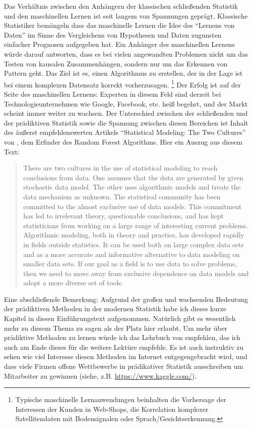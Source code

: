 \documentclass[a4paper,twoside]{tufte-book}\usepackage[]{graphicx}\usepackage[]{color}
\begin{document}
Das Verhältnis zwischen den Anhängern der klassischen schließenden Statistik und den maschinellen Lernen ist seit langem von Spannungen geprägt. Klassische Statistiker bemängeln dass das maschinelle Lernen die Idee des "`Lernens von Daten"' im Sinne des Vergleichens von Hypothesen und Daten zugunsten einfacher Prognosen aufgegeben hat. Ein Anhänger des maschinellen Lernens würde darauf antworten, dass es bei vielen angewandten Problemen nicht um das Testen von kausalen Zusammenhängen, sondern nur um das Erkennen von Pattern geht. Das Ziel ist es, einen Algorithmus zu erstellen, der in der Lage ist bei einem komplexen Datensatz korrekt vorherzusagen. \footnote{Typische maschinelle Lernanwendungen beinhalten die Vorhersage der Interessen der Kunden in Web-Shops, die Korrelation komplexer Satellitendaten mit Bodensignalen oder Sprach/Gesichtserkennung.} Der Erfolg ist auf der Seite des maschinellen Lernens: Experten in diesem Feld sind derzeit bei Technologieunternehmen wie Google, Facebook, etc. heiß begehrt, und der Markt scheint immer weiter zu wachsen. Der Unterschied zwischen der schließenden und der prädiktiven Statistik sowie die Spannung zwischen diesen Bereichen ist Inhalt des äußerst empfehlenswerten Artikels "`Statistical Modeling: The Two Cultures"' von \citet{Breiman-StatisticalModelingTwo-2001}, dem Erfinder des Random Forest Algorithms. Hier ein Auszug aus diesem Text:

\begin{quote}
There are two cultures in the use of statistical modeling to reach conclusions from data. One assumes that the data are generated by given stochastic data model. The other uses algorithmic models and treats the data mechanism as unknown. The statistical community has been committed to the almost exclusive use of data models. This commitment has led to irrelevant theory, questionable conclusions, and has kept statisticians from working on a large range of interesting current problems. Algorithmic modeling, both in theory and practice, has developed rapidly in fields outside statistics. It can be used both on large complex data sets and as a more accurate and informative alternative to data modeling on smaller data sets. If our goal as a field is to use data to solve problems, then we need to move away from exclusive dependence on data models and adopt a more diverse set of tools.
\end{quote}

Eine abschließende Bemerkung: Aufgrund der großen und wachsenden Bedeutung der prädiktiven Methoden in der modernen Statistik habe ich dieses kurze Kapitel in diesen Einführungstext aufgenommen. Natürlich gibt es wesentlich mehr zu diesem Thema zu sagen als der Platz hier erlaubt. Um mehr über prädiktive Methoden zu lernen würde ich das Lehrbuch von \citet{James-IntroductiontoStatistical-2013} empfehlen, das ich auch am Ende dieses für die weitere Lektüre empfehle. Es ist auch instruktiv zu sehen wie viel Interesse diesen Methoden im Internet entgegengebracht wird, und dass viele Firmen offene Wettbewerbe in prädikativer Statistik ausschreiben um Mitarbeiter zu gewinnen (siehe, z.B. \href{kaggle.com}{https://www.kaggle.com/}). 
\end{document}
